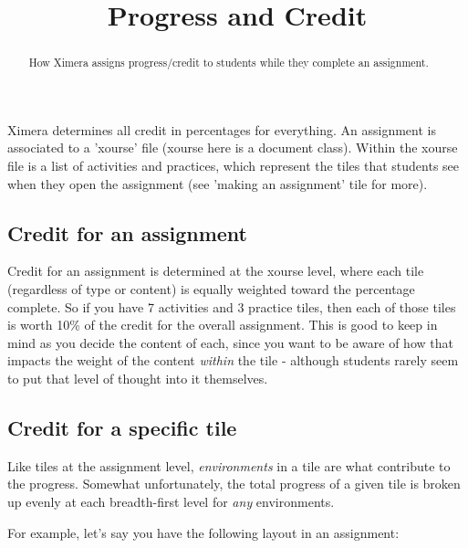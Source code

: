 \documentclass{ximera}
\title{Progress and Credit}
\begin{document}
\begin{abstract}
    How Ximera assigns progress/credit to students while they complete an assignment.
\end{abstract}
\maketitle

    Ximera determines all credit in percentages for everything. An assignment is associated to a 'xourse' file (xourse here is a document class). Within the xourse file is a list of activities and practices, which represent the tiles that students see when they open the assignment (see 'making an assignment' tile for more).
    
    \subsection*{Credit for an assignment}
        Credit for an assignment is determined at the xourse level, where each tile (regardless of type or content) is equally weighted toward the percentage complete. So if you have 7 activities and 3 practice tiles, then each of those tiles is worth 10\% of the credit for the overall assignment. This is good to keep in mind as you decide the content of each, since you want to be aware of how that impacts the weight of the content \textit{within} the tile - although students rarely seem to put that level of thought into it themselves.
        
    \subsection*{Credit for a specific tile}
        Like tiles at the assignment level, \textit{environments} in a tile are what contribute to the progress. Somewhat unfortunately, the total progress of a given tile is broken up evenly at each breadth-first level for \textit{any} environments. 
        
        For example, let's say you have the following layout in an assignment:
        
\end{document}

